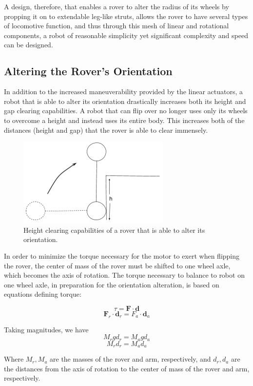 \documentclass[12pt]{article}
\numberwithin{figure}{section}
\begin{document}
\begin{multicols}{2}
A design, therefore, that enables a rover to alter the radius of its wheels by propping it on to extendable leg-like struts, allows the rover to have several types of locomotive function, and thus through this mesh of linear and rotational components, a robot of reasonable simplicity yet significant complexity and speed can be designed.

\subsection{Altering the Rover's Orientation}
In addition to the increased maneuverability provided by the linear actuators, a robot that is able to alter its orientation drastically increases both its height and gap clearing capabilities. A robot that can flip over no longer uses only its wheels to overcome a height and instead uses its entire body. This increases both of the distances (height and gap) that the rover is able to clear immensely. 

\begin{figure}[H]
\includegraphics{Flip_Over_Wall.PNG}
\caption{Height clearing capabilities of a rover that is able to alter its orientation.}
\label{fig:flipping-over-wall}
\end{figure}

In order to minimize the torque necessary for the motor to exert when flipping the rover, the center of mass of the rover must be shifted to one wheel axle, which becomes the axis of rotation. The torque necessary to balance to robot on one wheel axle, in preparation for the orientation alteration, is based on equations defining torque:

$$\tau = \bm F \cdot \bm d$$
$$\bm F_r \cdot \bm d_r = F_a \cdot \bm d_a$$

Taking magnitudes, we have
$$M_r g d_r = M_a g d_a$$
\begin{equation}
M_r d_r = M_a d_a
\end{equation}

Where $M_r, M_a$ are the masses of the rover and arm, respectively, and $d_r, d_a$ are the distances from the axis of rotation to the center of mass of the rover and arm, respectively.


\end{multicols}
\end{document}
